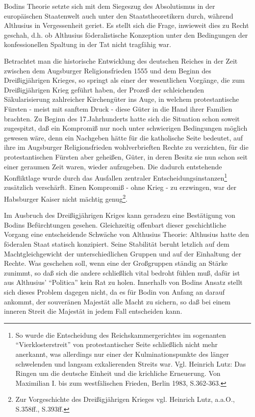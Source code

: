 \documentclass[a4paper,12pt]{article}
\begin{document}
Bodins Theorie setzte sich mit dem Siegeszug des Absolutismus in
der europäischen Staatenwelt auch unter den Staatstheoretikern
durch, während Althusius in Vergessenheit geriet. Es stellt sich
die Frage, inwieweit dies zu Recht geschah, d.h. ob Althusius
föderalistische Konzeption unter den Bedingungen der
konfessionellen Spaltung in der Tat nicht tragfähig war.

Betrachtet man die historische Entwicklung des deutschen Reiches in
der Zeit zwischen dem Augsburger Religionsfrieden 1555 und dem
Beginn des Dreißigjährigen Krieges, so springt als einer der
wesentlichen Vorgänge, die zum Dreißigjährigen Krieg geführt haben,
der Prozeß der schleichenden Säkularisierung zahlreicher
Kirchengüter ins Auge, in welchem protestantische Fürsten - meist
mit sanftem Druck - diese Güter in die Hand ihrer Familien
brachten. Zu Beginn des 17.Jahrhunderts hatte sich die Situation
schon soweit zugespitzt, daß ein Kompromiß nur noch unter
schwierigen Bedingungen möglich gewesen wäre, denn ein Nachgeben
hätte für die katholische Seite bedeutet, auf ihre im Augsburger
Religionsfrieden wohlverbrieften Rechte zu verzichten, für die
protestantischen Fürsten aber geheißen, Güter, in deren Besitz sie
nun schon seit einer geraumen Zeit waren, wieder aufzugeben. Die
dadurch entstehende Konfliktlage wurde durch das Ausfallen
zentraler Entscheidungsinstanzen\footnote{So wurde die Entscheidung
des Reichskammergerichtes im sogenanten "`Vierklosterstreit"' von
protestantischer Seite schließlich nicht mehr anerkannt, was
allerdings nur einer der Kulminationspunkte des länger schwelenden
und langsam exkalierenden Streits war. Vgl. Heinrich
Lutz\cite{lutz}: Das Ringen um die deutsche Einheit und die
krichliche Erneuerung. Von Maximilian I. bis zum westfälischen
Frieden, Berlin 1983, S.362-363.} zusätzlich verschärft. Einen
Kompromiß - ohne Krieg - zu erzwingen, war der Habsburger Kaiser
nicht mächtig genug\footnote{Zur Vorgeschichte des Dreißigjährigen
Krieges vgl. Heinrich Lutz\cite{lutz}, a.a.O., S.358ff., S.393ff.}.

Im Ausbruch des Dreißigjährigen Kriges kann geradezu eine
Bestätigung von Bodins Befürchtungen gesehen. Gleichzeitig
offenbart dieser geschichtliche Vorgang eine entscheidende Schwäche
von Althusius Theorie: Althusius hatte den föderalen Staat statisch
konzipiert. Seine Stabilität beruht letzlich auf dem
Machtgleichgewicht der unterschiedlichen Gruppen und auf der
Einhaltung der Rechte. Was geschehen soll, wenn eine der
Großgruppen ständig an Stärke zunimmt, so daß sich die andere
schließlich vital bedroht fühlen muß, dafür ist aus Althusius'
"`Politica"' kein Rat zu holen. Innerhalb von Bodins Ansatz stellt
sich dieses Problem dagegen nicht, da es für Bodin von Anfang an
darauf ankommt, der souveränen Majestät alle Macht zu sichern, so
daß bei einem inneren Streit die Majestät in jedem Fall entscheiden
kann.
\end{document}
